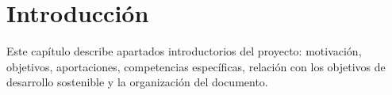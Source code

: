 \chapter{Introducción}

Este capítulo describe apartados introductorios del proyecto: motivación, objetivos, aportaciones, competencias específicas, relación con los objetivos de desarrollo sostenible y la organización del documento.








